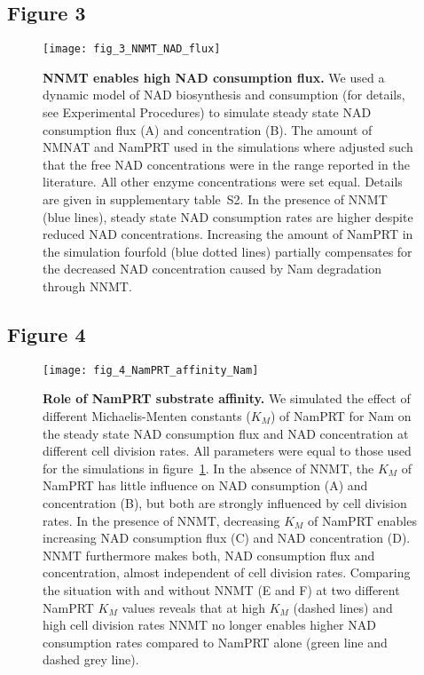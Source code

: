 \newpage


\subsection*{Figure 3}

\begin{figure}[ht]
  \centering
  \texttt{[image: fig\_3\_NNMT\_NAD\_flux]}
  \caption{\textbf{NNMT enables high NAD consumption flux.} We used a dynamic model of NAD biosynthesis and consumption (for details, see Experimental Procedures) to simulate steady state NAD consumption flux (A) and concentration (B). The amount of NMNAT and NamPRT used in the simulations where adjusted such that the free NAD concentrations were in the range reported in the literature. All other enzyme concentrations were set equal. Details are given in supplementary table~S2. In the presence of NNMT (blue lines), steady state NAD consumption rates are higher despite reduced NAD concentrations. Increasing the amount of NamPRT in the simulation fourfold (blue dotted lines) partially compensates for the decreased NAD concentration caused by Nam degradation through NNMT.}
  \label{fig:NNMT_NAD_flux}
\end{figure}

\newpage


\subsection*{Figure 4}

\begin{figure}[ht]
  \centering
  \texttt{[image: fig\_4\_NamPRT\_affinity\_Nam]}
  \caption{\textbf{Role of NamPRT substrate affinity.} We simulated the effect of different Michaelis-Menten constants ($K_{M}$) of NamPRT for Nam on the steady state NAD consumption flux and NAD concentration at different cell division rates. All parameters were equal to those used for the simulations in figure~\ref{fig:NNMT_NAD_flux}. In the absence of NNMT, the $K_{M}$ of NamPRT has little influence on NAD consumption (A) and concentration (B), but both are strongly influenced by cell division rates. In the presence of NNMT, decreasing $K_{M}$ of NamPRT enables increasing NAD consumption flux (C) and NAD concentration (D). NNMT furthermore makes both, NAD consumption flux and concentration, almost independent of cell division rates. Comparing the situation with and without NNMT (E and F) at two different NamPRT $K_{M}$ values reveals that at high $K_{M}$ (dashed lines) and high cell division rates NNMT no longer enables higher NAD consumption rates compared to NamPRT alone (green line and dashed grey line).}
  \label{fig:NamPRT_affinity_Nam}
\end{figure}

